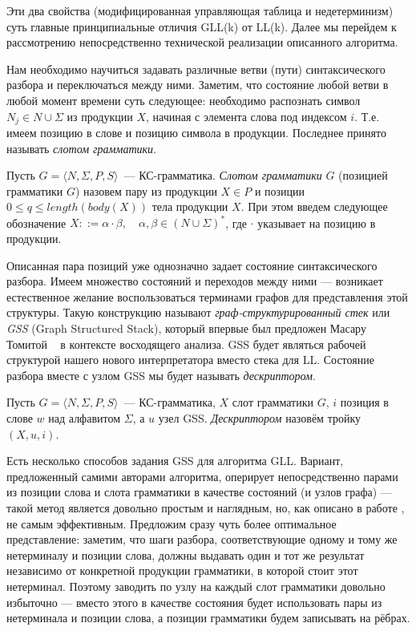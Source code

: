 Эти два свойства (модифицированная управляющая таблица и недетерминизм) суть главные принципиальные отличия GLL(k) от LL(k). Далее мы перейдем к рассмотрению непосредственно технической реализации описанного алгоритма.

Нам необходимо научиться задавать различные ветви (пути) синтаксического разбора и переключаться между ними. Заметим, что состояние любой ветви в любой момент времени суть следующее: необходимо распознать символ $N_j \in N \cup \Sigma$ из продукции $X$, начиная с элемента слова под индексом $i$. Т.е. имеем позицию в слове и позицию символа в продукции. Последнее принято называть \textit{слотом грамматики}. 

\begin{definition}
  Пусть $G = \langle N, \Sigma, P, S \rangle$~--- КС-грамматика. \textit{Слотом грамматики} $G$ (позицией грамматики $G$) назовем пару из продукции $X \in P$ и позиции $0 \leq q \leq length(body(X))$ тела продукции $X$. При этом введем следующее обозначение $X ::= \alpha \cdot \beta, \quad \alpha,\beta \in (N \cup \Sigma)^*$, где $ \cdot $ указывает на позицию в продукции.
\end{definition}

Описанная пара позиций уже однозначно задает состояние синтаксического разбора. Имеем множество состояний и переходов между ними --- возникает естественное желание воспользоваться терминами графов для представления этой структуры. Такую конструкцию называют \textit{граф-структурированный стек} или \textit{GSS} (Graph Structured Stack), который впервые был предложен Масару Томитой ~\cite{tomita1988graph} в контексте восходящего анализа. GSS будет являться рабочей структурой нашего нового интерпретатора вместо стека для LL. Состояние разбора вместе с узлом GSS мы будет называть \textit{дескриптором}.

\begin{definition} 
  Пусть $G = \langle N, \Sigma, P, S \rangle$~--- КС-грамматика, $X$ слот грамматики $G$, $i$ позиция в слове $ w $ над алфавитом $\Sigma$, а $ u $ узел GSS. \textit{Дескриптором} назовём тройку $ (X, u, i) $.
\end{definition}

Есть несколько способов задания GSS для алгоритма GLL. Вариант, предложенный самими авторами алгоритма, оперирует непосредственно парами из позиции слова и слота грамматики в качестве состояний (и узлов графа) --- такой метод является довольно простым и наглядным, но, как описано в работе \cite{10.1007/978-3-662-46663-6_5}, не самым эффективным. Предложим сразу чуть более оптимальное представление: заметим, что шаги разбора, соответствующие одному и тому же нетерминалу и позиции слова, должны выдавать один и тот же результат независимо от конкретной продукции грамматики, в которой стоит этот нетерминал. Поэтому заводить по узлу на каждый слот грамматики довольно избыточно --- вместо этого в качестве состояния будет использовать пары из нетерминала и позиции слова, а позиции грамматики будем записывать на рёбрах.  

